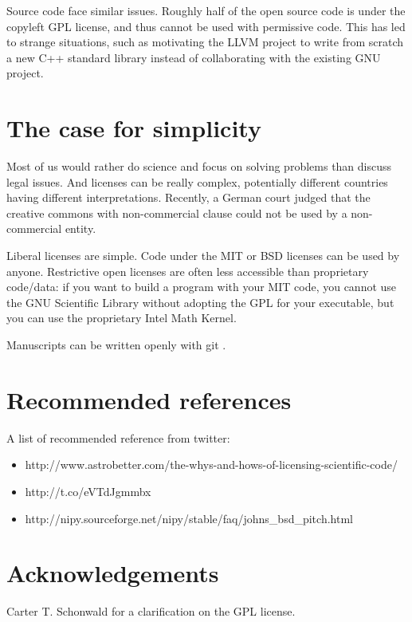 \documentclass[letterpaper]{article}
\begin{document}
Source code face similar issues. Roughly half of the open source code is
under the copyleft GPL license, and thus cannot be used with permissive
code. This has led to strange situations, such as motivating the LLVM project
to write from scratch a new C++ standard library instead of collaborating
with the existing GNU project.


\section{The case for simplicity}

Most of us would rather do science and focus on solving problems than discuss
legal issues.  And licenses can be really complex, potentially different
countries having different interpretations. Recently, a German court judged
that the creative commons with non-commercial clause could not be used by
a non-commercial entity. %

Liberal licenses are simple. Code under the MIT or BSD licenses can be used by
anyone. Restrictive open licenses are often less accessible than proprietary
code/data: if you want to build a program with your MIT code, you cannot use
the GNU Scientific Library without adopting the GPL for your executable, but
you can use the proprietary Intel Math Kernel.

Manuscripts can be written openly with git \cite{ram13}.

\section{Recommended references}
A list of recommended reference from twitter:
\begin{itemize}
\item http://www.astrobetter.com/the-whys-and-hows-of-licensing-scientific-code/
\item http://t.co/eVTdJgmmbx
\item http://nipy.sourceforge.net/nipy/stable/faq/johns_bsd_pitch.html
\end{itemize}

\section{Acknowledgements}

Carter T. Schonwald for a clarification on the GPL license.



\end{document}
